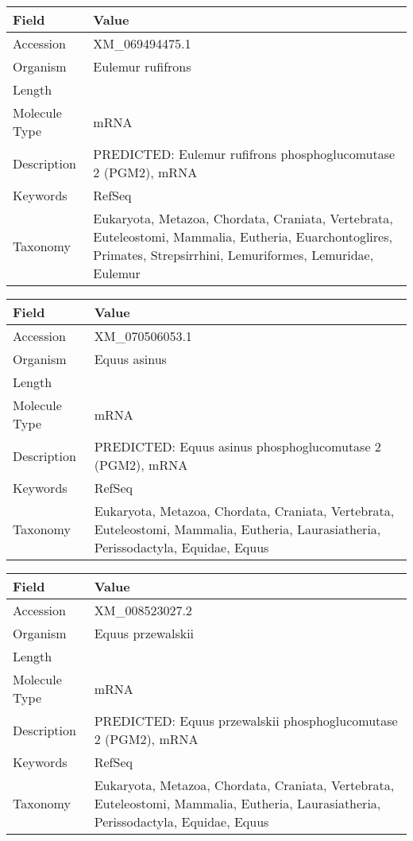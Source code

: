 \documentclass[10pt]{article}
\begin{document}
\vspace{1em}
{\footnotesize
\begin{longtable}{>{\raggedright\arraybackslash}p{4.5cm} >{\raggedright\arraybackslash}p{11.5cm}}
\textbf{Field} & \textbf{Value} \\
\hline
Accession & XM\_069494475.1 \\
Organism & Eulemur rufifrons \\
Length & 3204 \\
Molecule Type & mRNA \\
Description & PREDICTED: Eulemur rufifrons phosphoglucomutase 2 (PGM2), mRNA \\
Keywords & RefSeq \\
Taxonomy & Eukaryota, Metazoa, Chordata, Craniata, Vertebrata, Euteleostomi, Mammalia, Eutheria, Euarchontoglires, Primates, Strepsirrhini, Lemuriformes, Lemuridae, Eulemur \\
\end{longtable}
}

\vspace{1em}
{\footnotesize
\begin{longtable}{>{\raggedright\arraybackslash}p{4.5cm} >{\raggedright\arraybackslash}p{11.5cm}}
\textbf{Field} & \textbf{Value} \\
\hline
Accession & XM\_070506053.1 \\
Organism & Equus asinus \\
Length & 2941 \\
Molecule Type & mRNA \\
Description & PREDICTED: Equus asinus phosphoglucomutase 2 (PGM2), mRNA \\
Keywords & RefSeq \\
Taxonomy & Eukaryota, Metazoa, Chordata, Craniata, Vertebrata, Euteleostomi, Mammalia, Eutheria, Laurasiatheria, Perissodactyla, Equidae, Equus \\
\end{longtable}
}

\vspace{1em}
{\footnotesize
\begin{longtable}{>{\raggedright\arraybackslash}p{4.5cm} >{\raggedright\arraybackslash}p{11.5cm}}
\textbf{Field} & \textbf{Value} \\
\hline
Accession & XM\_008523027.2 \\
Organism & Equus przewalskii \\
Length & 4403 \\
Molecule Type & mRNA \\
Description & PREDICTED: Equus przewalskii phosphoglucomutase 2 (PGM2), mRNA \\
Keywords & RefSeq \\
Taxonomy & Eukaryota, Metazoa, Chordata, Craniata, Vertebrata, Euteleostomi, Mammalia, Eutheria, Laurasiatheria, Perissodactyla, Equidae, Equus \\
\end{longtable}
}
\end{document}

